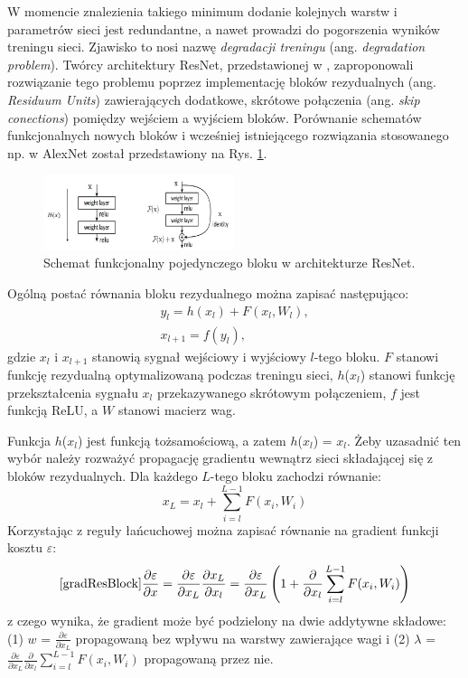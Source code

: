 W momencie znalezienia takiego minimum dodanie kolejnych warstw i parametrów sieci jest redundantne, a nawet prowadzi do pogorszenia wyników treningu sieci. Zjawisko to nosi nazwę \textit{degradacji treningu} (ang. \textit{degradation problem}). Twórcy architektury ResNet, przedstawionej w \cite{ResNet}, zaproponowali rozwiązanie tego problemu poprzez implementację bloków rezydualnych (ang. \textit{Residuum Units}) zawierających dodatkowe, skrótowe połączenia (ang. \textit{skip conections}) pomiędzy wejściem a wyjściem bloków. Porównanie schematów funkcjonalnych nowych bloków i wcześniej istniejącego rozwiązania stosowanego np. w AlexNet został przedstawiony na Rys. \ref{ResNetBlock}.
\begin{figure}[h!]
	\centering
	\includegraphics[width=0.5\textwidth]{figures/ResidualBlock.jpg}
	\caption{Schemat funkcjonalny pojedynczego bloku w architekturze ResNet.}
	\label{ResNetBlock}
\end{figure} 

Ogólną postać równania bloku rezydualnego można zapisać następująco:
\begin{equation}
\begin{split}
y_l = h(x_l) + F(x_l, W_l),\\
x_{l+1} = f(y_l),
\end{split}
\end{equation}
gdzie $x_l$ i $x_{l+1}$ stanowią sygnał wejściowy i wyjściowy $l$-tego bloku. $F$ stanowi funkcję rezydualną optymalizowaną podczas treningu sieci, $h$($x_l$) stanowi funkcję przekształcenia sygnału $x_l$ przekazywanego skrótowym połączeniem, $f$ jest funkcją ReLU, a $W$ stanowi macierz wag.

Funkcja $h$($x_l$) jest funkcją tożsamościową, a zatem $h$($x_l$) = $x_l$. Żeby uzasadnić ten wybór należy rozważyć propagację gradientu wewnątrz sieci składającej się z bloków rezydualnych. Dla każdego $L$-tego bloku zachodzi równanie:
\begin{equation}
x_L = x_l + \sum_{i=l}^{L-1}F(x_i, W_i)
\end{equation}
Korzystając z reguły łańcuchowej można zapisać równanie na gradient funkcji kosztu $\varepsilon$:
\begin{equation}
\ref{gradResBlock}
\frac{\partial \varepsilon}{\partial x} =  \frac{\partial \varepsilon}{\partial x_L} \frac{\partial x_L}{\partial x_l} =  \frac{\partial \varepsilon}{\partial x_L}\left (1 +   \frac{\partial }{\partial x_l}\sum_{i=l}^{L-1}F(x_i, W_i) \right )
\end{equation}
z czego wynika, że gradient może być podzielony na dwie addytywne składowe: (1) $w$ = $\frac{\partial \varepsilon}{\partial x_L}$ propagowaną bez wpływu na warstwy zawierające wagi i (2) $\lambda$ = $\frac{\partial \varepsilon}{\partial x_L}\frac{\partial }{\partial x_l}\sum_{i=l}^{L-1}F(x_i, W_i)$ propagowaną przez nie.

